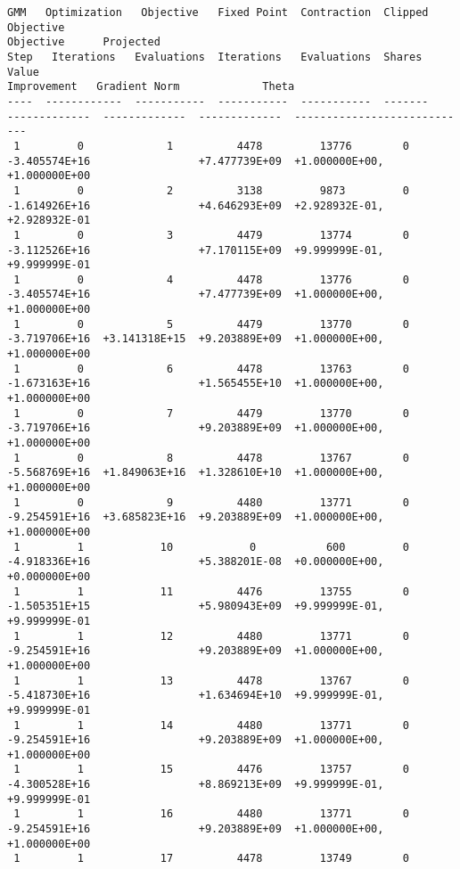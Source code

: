 \begin{Verbatim}[commandchars=\\\{\}]
GMM   Optimization   Objective   Fixed Point  Contraction  Clipped    Objective
Objective      Projected
Step   Iterations   Evaluations  Iterations   Evaluations  Shares       Value
Improvement   Gradient Norm             Theta
----  ------------  -----------  -----------  -----------  -------
-------------  -------------  -------------  ----------------------------
 1         0             1          4478         13776        0
-3.405574E+16                 +7.477739E+09  +1.000000E+00, +1.000000E+00
 1         0             2          3138         9873         0
-1.614926E+16                 +4.646293E+09  +2.928932E-01, +2.928932E-01
 1         0             3          4479         13774        0
-3.112526E+16                 +7.170115E+09  +9.999999E-01, +9.999999E-01
 1         0             4          4478         13776        0
-3.405574E+16                 +7.477739E+09  +1.000000E+00, +1.000000E+00
 1         0             5          4479         13770        0
-3.719706E+16  +3.141318E+15  +9.203889E+09  +1.000000E+00, +1.000000E+00
 1         0             6          4478         13763        0
-1.673163E+16                 +1.565455E+10  +1.000000E+00, +1.000000E+00
 1         0             7          4479         13770        0
-3.719706E+16                 +9.203889E+09  +1.000000E+00, +1.000000E+00
 1         0             8          4478         13767        0
-5.568769E+16  +1.849063E+16  +1.328610E+10  +1.000000E+00, +1.000000E+00
 1         0             9          4480         13771        0
-9.254591E+16  +3.685823E+16  +9.203889E+09  +1.000000E+00, +1.000000E+00
 1         1            10            0           600         0
-4.918336E+16                 +5.388201E-08  +0.000000E+00, +0.000000E+00
 1         1            11          4476         13755        0
-1.505351E+15                 +5.980943E+09  +9.999999E-01, +9.999999E-01
 1         1            12          4480         13771        0
-9.254591E+16                 +9.203889E+09  +1.000000E+00, +1.000000E+00
 1         1            13          4478         13767        0
-5.418730E+16                 +1.634694E+10  +9.999999E-01, +9.999999E-01
 1         1            14          4480         13771        0
-9.254591E+16                 +9.203889E+09  +1.000000E+00, +1.000000E+00
 1         1            15          4476         13757        0
-4.300528E+16                 +8.869213E+09  +9.999999E-01, +9.999999E-01
 1         1            16          4480         13771        0
-9.254591E+16                 +9.203889E+09  +1.000000E+00, +1.000000E+00
 1         1            17          4478         13749        0

\end{Verbatim}
